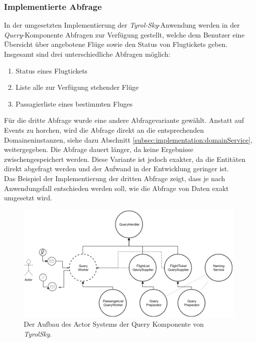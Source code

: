 \subsubsection{Implementierte Abfrage}
In der umgesetzten Implementierung der \textit{Tyrol-Sky}-Anwendung werden in der \textit{Query}-Komponente Abfragen zur Verfügung gestellt, welche dem Benutzer eine Übersicht über angebotene Flüge sowie den Status von Flugtickets geben. Insgesamt sind drei unterschiedliche Abfragen möglich:

\begin{enumerate}
    \item Status eines Flugtickets 
    \item Liste alle zur Verfügung stehender Flüge
    \item Passagierliste eines bestimmten Fluges
\end{enumerate}

Für die dritte Abfrage wurde eine andere Abfragevariante gewählt. Anstatt auf Events zu horchen, wird die Abfrage direkt an die entsprechenden Domaineninstanzen, siehe dazu Abschnitt \ref{subsec:implementation:domainService}, weitergegeben. Die Abfrage dauert länger, da keine Ergebnisse zwischengespeichert werden. Diese Variante ist jedoch exakter, da die Entitäten direkt abgefragt werden und der Aufwand in der Entwicklung geringer ist. \\
Das Beispiel der Implementierung der dritten Abfrage zeigt, dass je nach Anwendungsfall entschieden werden soll, wie die Abfrage von Daten exakt umgesetzt wird.
\begin{figure}
    \centering
    \includegraphics[width=\linewidth]{gfx/implementation/QueringServiceActorModel}
    \caption{Der Aufbau des Actor Systems der Query Komponente von \textit{TyrolSky}.}
    \label{fig:implementation:queryActorModel}
\end{figure} 


